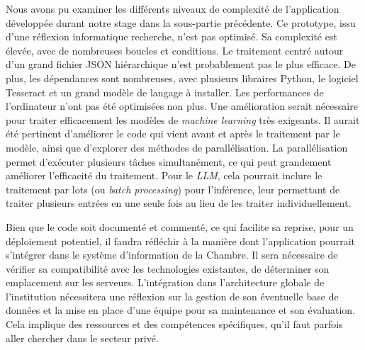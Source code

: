 Nous avons pu examiner les différents niveaux de complexité de l'application développée durant notre stage dans la sous-partie précédente. Ce prototype, issu d'une réflexion informatique recherche, n'est pas optimisé. Sa complexité est élevée, avec de nombreuses boucles et conditions. Le traitement centré autour d'un grand fichier JSON hiérarchique n'est probablement pas le plus efficace. De plus, les dépendances sont nombreuses, avec plusieurs libraires Python, le logiciel Tesseract et un grand modèle de langage à installer. Les performances de l'ordinateur n'ont pas été optimisées non plus. Une amélioration serait nécessaire pour traiter efficacement les modèles de \emph{machine learning} très exigeants.
Il aurait été pertinent d'améliorer le code qui vient avant et après le traitement par le modèle, ainsi que d'explorer des méthodes de parallélisation. La parallélisation permet d'exécuter plusieurs tâches simultanément, ce qui peut grandement améliorer l'efficacité du traitement. Pour le \emph{LLM}, cela pourrait inclure le traitement par lots (ou \emph{batch processing}) pour l'inférence, leur permettant de traiter plusieurs entrées en une seule fois au lieu de les traiter individuellement.

Bien que le code soit documenté et commenté, ce qui facilite sa reprise, pour un déploiement potentiel, il faudra réfléchir à la manière dont
l'application pourrait s'intégrer dans le système d'information de la Chambre. Il sera nécessaire de vérifier sa compatibilité avec les technologies existantes, de déterminer son emplacement sur les serveurs. L'intégration dans l'architecture globale de l'institution nécessitera une réflexion sur la gestion de son éventuelle base de données et la mise en place d'une équipe pour sa maintenance et son évaluation. Cela implique des ressources et des compétences spécifiques, qu'il faut parfois aller chercher dans le secteur privé.

